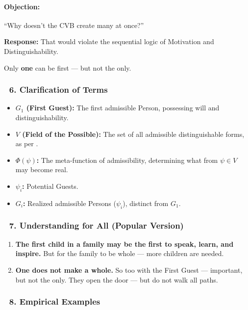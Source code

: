 \documentclass[12pt]{article}
\begin{document}
\bigskip

\paragraph{Objection:}
``Why doesn't the CVB create many at once?''

\textbf{Response:} That would violate the sequential logic of Motivation and Distinguishability.

Only \textbf{one} can be first — but not the only.

\subsubsection*{🔹 6. Clarification of Terms}

\begin{itemize}
\item \textbf{$G_1$ (First Guest):} The first admissible Person, possessing will and distinguishability.
\item \textbf{$V$ (Field of the Possible):} The set of all admissible distinguishable forms, as per \text{[4]}.
\item \textbf{$\Phi(\psi)$:} The meta-function of admissibility, determining what from $\psi \in V$ may become real.
\item \textbf{$\psi_i$:} Potential Guests.
\item \textbf{$G_i$:} Realized admissible Persons ($\psi_i$), distinct from $G_1$.
\end{itemize}

\subsubsection*{🔹 7. Understanding for All (Popular Version)}

\begin{enumerate}
\item \textbf{The first child in a family may be the first to speak, learn, and inspire.}
But for the family to be whole — more children are needed.

\item \textbf{One does not make a whole.}
So too with the First Guest — important, but not the only.
They open the door — but do not walk all paths.
\end{enumerate}

\subsubsection*{🔹 8. Empirical Examples}
\end{document}
